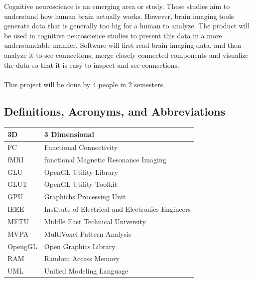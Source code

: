 \documentclass[paper=a4, fontsize=12pt]{scrartcl}	%
\numberwithin{equation}{section}		%
\numberwithin{figure}{section}			%
\numberwithin{table}{section}				%
\newcommand{\skipsubsection}[0]{\vspace{1cm}}
\begin{document}
        Cognitive neuroscience is an emerging area or study. These studies aim to understand how human brain actually works. However, brain imaging tools generate data that is generally too big for a human to analyze. The product will be used in cognitive neuroscience studies to present this data in a more understandable manner. Software will first read brain imaging data, and then analyze it to see connections, merge closely connected components and visualize the data so that it is easy to inspect and see connections.\\\\
        
        This project will be done by 4 people in 2 semesters.\\
        
    \skipsubsection 
        
	\subsection{Definitions, Acronyms, and Abbreviations}
   	 \begin{tabular}{|p{3cm}|p{12cm}|}
     	\hline 
  			3D & 3 Dimensional \\
        \hline
  			FC & Functional Connectivity \\
     	\hline
  			fMRI & functional Magnetic Resonance Imaging \\
        \hline
  			GLU & OpenGL Utility Library \\
        \hline
  			GLUT & OpenGL Utility Toolkit \\
        \hline
  			GPU &  Graphichs Processing Unit \\   
  		\hline
  			IEEE & Institute of Electrical and Electronics Engineers \\
        \hline
  			METU & Middle East Technical University \\
  		\hline
  			MVPA & MultiVoxel Pattern Analysis \\
        \hline
  			OpengGL & Open Graphics Library \\
        \hline
  			RAM & Random Access Memory \\
  		\hline
        	UML & Unified Modeling Language \\
  		\hline
	 \end{tabular}
\end{document}
